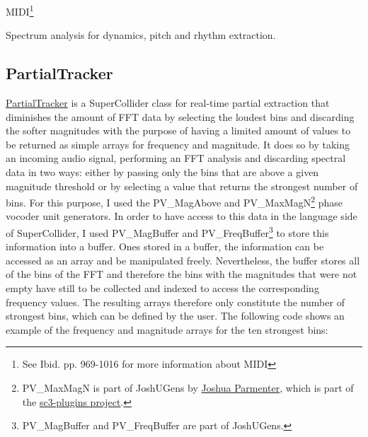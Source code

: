 MIDI\footnote{See Ibid. pp. 969-1016 for more information about MIDI}

Spectrum analysis for dynamics, pitch and rhythm extraction. 


\subsection{PartialTracker}
\hypertarget{partrack}{}
\href{http://github.com/freuben/FedeLib/blob/master/PartialTracking/PartialTracker.sc}{PartialTracker} is a SuperCollider class for real-time partial extraction that diminishes the amount of FFT data by selecting the loudest bins and discarding the softer magnitudes with the purpose of having a limited amount of values to be returned as simple arrays for frequency and magnitude. It does so by taking an incoming audio signal, performing an FFT analysis and discarding spectral data in two ways: either by passing only the bins that are above a given magnitude threshold or by selecting a value that returns the strongest number of bins. For this purpose, I used the PV\_MagAbove and PV\_MaxMagN\footnote{PV\_MaxMagN is part of JoshUGens by \href{http://www.realizedsound.net/josh/}{Joshua Parmenter}, which is part of the \href{http://sourceforge.net/projects/sc3-plugins/}{sc3-plugins project}.} phase vocoder unit generators. In order to have access to this data in the language side of SuperCollider, I used PV\_MagBuffer and PV\_FreqBuffer\footnote{PV\_MagBuffer and PV\_FreqBuffer are part of JoshUGens.} to store this information into a buffer. Ones stored in a buffer, the information can be accessed as an array and be manipulated freely. Nevertheless, the buffer stores all of the bins of the FFT and therefore the bins with the magnitudes that were not empty have still to be collected and indexed to access the corresponding frequency values. The resulting arrays therefore only constitute the number of strongest bins, which can be defined by the user. The following code shows an example of the frequency and magnitude arrays for the ten strongest bins:

